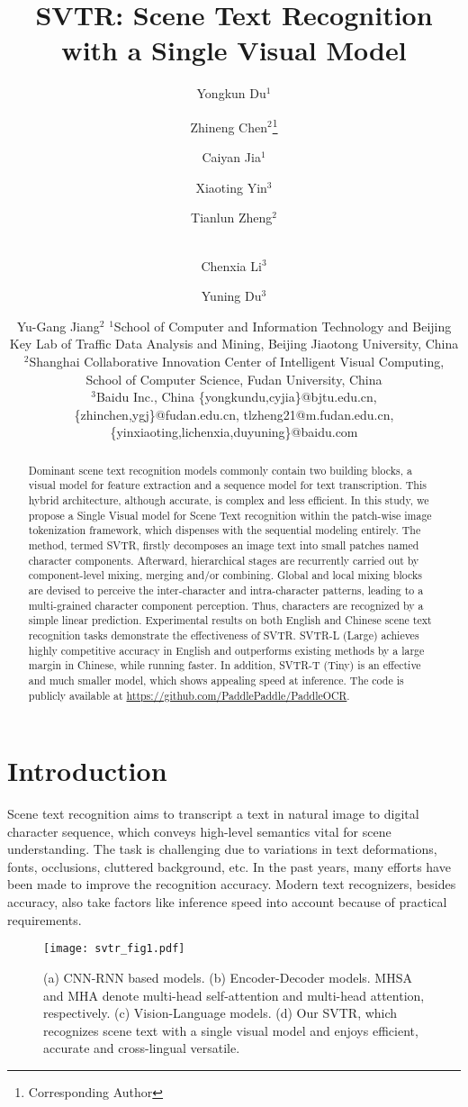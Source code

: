 \documentclass{article}
\title{SVTR: Scene Text Recognition with a Single Visual Model}
\author{
Yongkun Du$^{1}$\and
Zhineng Chen$^{2}$\footnote{Corresponding Author}\and
Caiyan Jia$^{1}$\and
Xiaoting Yin$^3$\and
Tianlun Zheng$^2$\and\\
Chenxia Li$^3$\and
Yuning Du$^3$\and
Yu-Gang Jiang$^2$
\affiliations
$^1$School of Computer and Information Technology and Beijing Key Lab of Traffic Data Analysis and Mining, Beijing Jiaotong University, China\\
$^2$Shanghai Collaborative Innovation Center of Intelligent Visual Computing, School of Computer Science, Fudan University, China\\
$^3$Baidu Inc., China
\emails
\{yongkundu,cyjia\}@bjtu.edu.cn,
\{zhinchen,ygj\}@fudan.edu.cn,
tlzheng21@m.fudan.edu.cn,
\{yinxiaoting,lichenxia,duyuning\}@baidu.com
}
\begin{document}
\maketitle

\begin{abstract}
Dominant scene text recognition models commonly contain two building blocks, a visual model for feature extraction and a sequence model for text transcription. This hybrid architecture, although accurate, is complex and less efficient. In this study, we propose a Single Visual model for Scene Text recognition within the patch-wise image tokenization framework, which dispenses with the sequential modeling entirely. The method, termed SVTR, firstly decomposes an image text into small patches named character components. Afterward, hierarchical stages are recurrently carried out by component-level mixing, merging and/or combining. Global and local mixing blocks are devised to perceive the inter-character and intra-character patterns, leading to a multi-grained character component perception. Thus, characters are recognized by a simple linear prediction. Experimental results on both English and Chinese scene text recognition tasks demonstrate the effectiveness of SVTR. SVTR-L (Large) achieves highly competitive accuracy in English and outperforms existing methods by a large margin in Chinese, while running faster. In addition, SVTR-T (Tiny) is an effective and much smaller model, which shows appealing speed at inference. The code is publicly available at \url{https://github.com/PaddlePaddle/PaddleOCR}.


\end{abstract}

\section{Introduction}
Scene text recognition aims to transcript a text in natural image to digital character sequence, which conveys high-level semantics vital for scene understanding. The task is challenging due to variations in text deformations, fonts, occlusions, cluttered background, etc. In the past years, many efforts have been made to improve the recognition accuracy. Modern text recognizers, besides accuracy, also take factors like inference speed into account because of practical requirements.

\begin{figure}[ht] 
\centering
\texttt{[image: svtr\_fig1.pdf]}  
\caption{(a) CNN-RNN based models. (b) Encoder-Decoder models. MHSA and MHA denote multi-head self-attention and multi-head attention, respectively. (c) Vision-Language models. (d) Our SVTR, which recognizes scene text with a single visual model and enjoys efficient, accurate and cross-lingual versatile.}  
\label{fig:1}  
\end{figure}
\end{document}
